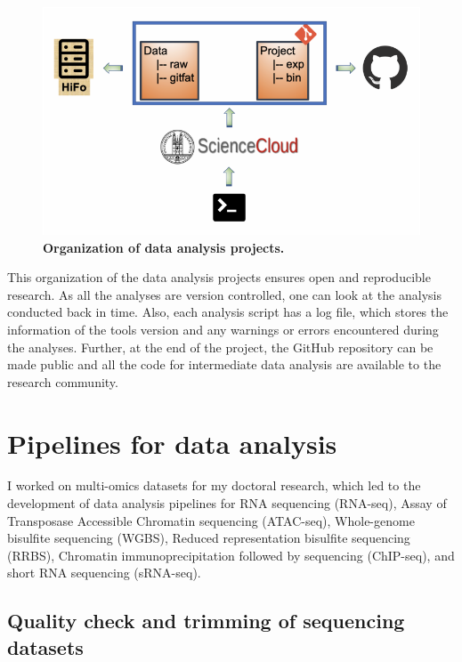 \documentclass[12pt,twoside]{reedthesis}
\begin{document}
\begin{figure}[htbp]

{\centering \includegraphics{thesis_files/figure-latex/mf2-1} 

}

\caption[Organization of data analysis projects]{\textbf{Organization of data analysis projects.}}\label{fig:mf2}
\end{figure}
This organization of the data analysis projects ensures open and
reproducible research. As all the analyses are version controlled, one
can look at the analysis conducted back in time. Also, each analysis
script has a log file, which stores the information of the tools version
and any warnings or errors encountered during the analyses. Further, at
the end of the project, the GitHub repository can be made public and all
the code for intermediate data analysis are available to the research
community.

\hypertarget{m3}{%
\section*{Pipelines for data analysis}\label{m3}}

I worked on multi-omics datasets for my doctoral research, which led to
the development of data analysis pipelines for RNA sequencing (RNA-seq),
Assay of Transposase Accessible Chromatin sequencing (ATAC-seq),
Whole-genome bisulfite sequencing (WGBS), Reduced representation
bisulfite sequencing (RRBS), Chromatin immunoprecipitation followed by
sequencing (ChIP-seq), and short RNA sequencing (sRNA-seq).

\hypertarget{m3.1}{%
\subsection*{Quality check and trimming of sequencing datasets}\label{m3.1}}
\end{document}
